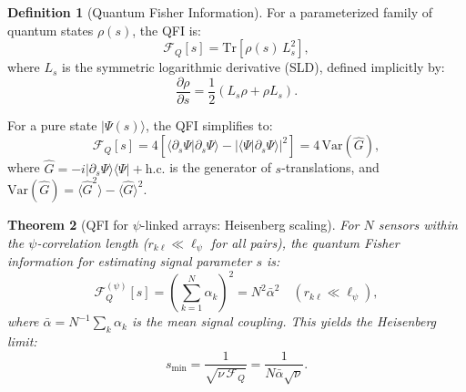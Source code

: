 \documentclass[aps,prl,twocolumn,superscriptaddress,showpacs]{revtex4-2}
\newtheorem{theorem}{Theorem}
\theoremstyle{definition}
\newtheorem{definition}[theorem]{Definition}
\newcommand{\Tr}{\mathrm{Tr}}
\begin{document}
\begin{definition}[Quantum Fisher Information]
For a parameterized family of quantum states $\rho(s)$, the QFI is:
\begin{equation}
\mathcal{F}_Q[s] = \Tr[\rho(s)\,L_s^2],
\label{eq:qfi-definition}
\end{equation}
where $L_s$ is the symmetric logarithmic derivative (SLD), defined
implicitly by:
\begin{equation}
\frac{\partial\rho}{\partial s} = \frac{1}{2}(L_s\rho + \rho L_s).
\label{eq:sld-definition}
\end{equation}
\end{definition}

For a pure state $|\Psi(s)\rangle$, the QFI simplifies to:
\begin{equation}
\mathcal{F}_Q[s] = 4\left[\langle\partial_s\Psi|\partial_s\Psi\rangle
- |\langle\Psi|\partial_s\Psi\rangle|^2\right]
= 4\,\mathrm{Var}(\hat{G}),
\label{eq:qfi-pure}
\end{equation}
where $\hat{G} = -i|\partial_s\Psi\rangle\langle\Psi| + \text{h.c.}$
is the generator of $s$-translations, and
$\mathrm{Var}(\hat{G}) = \langle\hat{G}^2\rangle - \langle\hat{G}\rangle^2$.

\begin{theorem}[QFI for $\psi$-linked arrays: Heisenberg scaling]
\label{thm:qfi-heisenberg}
For $N$ sensors within the $\psi$-correlation length
($r_{k\ell} \ll \ell_\psi$ for all pairs), the quantum Fisher
information for estimating signal parameter $s$ is:
\begin{equation}
\boxed{\mathcal{F}_Q^{(\psi)}[s] = \left(\sum_{k=1}^N \alpha_k\right)^2
= N^2\bar{\alpha}^2 \quad (r_{k\ell} \ll \ell_\psi)},
\label{eq:qfi-heisenberg}
\end{equation}
where $\bar{\alpha} = N^{-1}\sum_k\alpha_k$ is the mean signal
coupling. This yields the Heisenberg limit:
\begin{equation}
s_{\min} = \frac{1}{\sqrt{\nu\,\mathcal{F}_Q}} = \frac{1}{N\bar{\alpha}\sqrt{\nu}}.
\label{eq:heisenberg-limit}
\end{equation}
\end{theorem}
\end{document}
